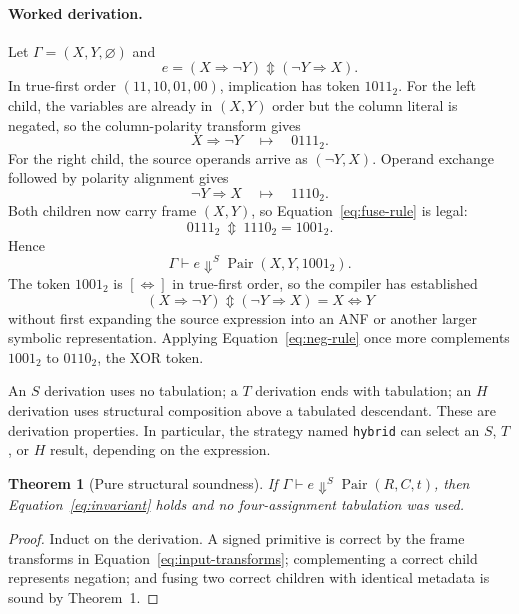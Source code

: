 \documentclass[10pt]{article}
\newcommand{\bxor}{\mathbin{\Updownarrow}}
\newcommand{\Pair}{\operatorname{Pair}}
\theoremstyle{plain}
\newtheorem{theorem}{Theorem}
\theoremstyle{definition}
\theoremstyle{remark}
\begin{document}
\paragraph{Worked derivation.}
Let $\Gamma=(X,Y,\varnothing)$ and
\begin{equation}
 e=(X\Rightarrow\neg Y)\bxor(\neg Y\Rightarrow X).
 \label{eq:worked-expression}
\end{equation}
In true-first order $(11,10,01,00)$, implication has token $1011_2$. For the left child, the variables are already in $(X,Y)$ order but the column literal is negated, so the column-polarity transform gives
\[
 X\Rightarrow\neg Y\quad\longmapsto\quad 0111_2.
\]
For the right child, the source operands arrive as $(\neg Y,X)$. Operand exchange followed by polarity alignment gives
\[
 \neg Y\Rightarrow X\quad\longmapsto\quad 1110_2.
\]
Both children now carry frame $(X,Y)$, so Equation~\eqref{eq:fuse-rule} is legal:
\begin{equation}
 0111_2\ \bxor\ 1110_2=1001_2.
 \label{eq:worked-fusion}
\end{equation}
Hence
\[
 \Gamma\vdash e\Downarrow^S\Pair(X,Y,1001_2).
\]
The token $1001_2$ is $[\Leftrightarrow]$ in true-first order, so the compiler has established
\[
 (X\Rightarrow\neg Y)\bxor(\neg Y\Rightarrow X)=X\Leftrightarrow Y
\]
without first expanding the source expression into an ANF or another larger symbolic representation. Applying Equation~\eqref{eq:neg-rule} once more complements $1001_2$ to $0110_2$, the XOR token.

An $S$ derivation uses no tabulation; a $T$ derivation ends with tabulation; an $H$ derivation uses structural composition above a tabulated descendant. These are derivation properties. In particular, the strategy named \texttt{hybrid} can select an $S$, $T$, or $H$ result, depending on the expression.

\begin{theorem}[Pure structural soundness]
If $\Gamma\vdash e\Downarrow^S\Pair(R,C,t)$, then Equation~\eqref{eq:invariant} holds and no four-assignment tabulation was used.
\end{theorem}

\begin{proof}
Induct on the derivation. A signed primitive is correct by the frame transforms in Equation~\eqref{eq:input-transforms}; complementing a correct child represents negation; and fusing two correct children with identical metadata is sound by Theorem~1.
\end{proof}
\end{document}
